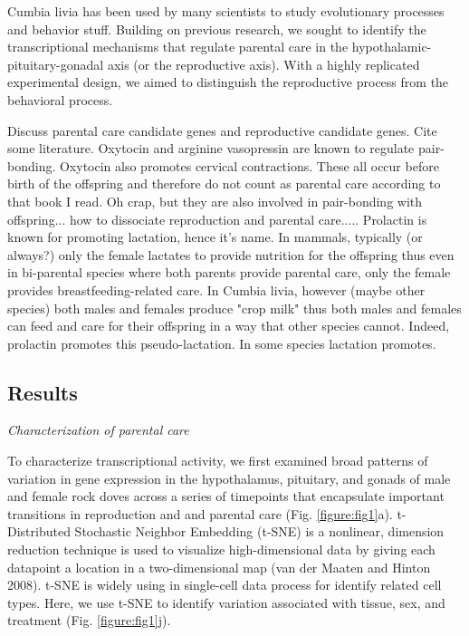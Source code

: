 Cumbia livia has been used by many scientists to study evolutionary processes and behavior stuff. Building on previous research, we sought to identify the transcriptional mechanisms that regulate parental care in the hypothalamic-pituitary-gonadal axis (or the reproductive axis). With a highly replicated experimental design, we aimed to distinguish the reproductive process from the behavioral process. 

Discuss parental care candidate genes and reproductive candidate genes. Cite some literature.  Oxytocin and arginine vasopressin are known to regulate pair-bonding.  Oxytocin also promotes cervical contractions. These all occur before birth of the offspring and therefore do not count as parental care according to that book I read. Oh crap, but they are also involved in pair-bonding with offspring... how to dissociate reproduction and parental care..... Prolactin is known for promoting lactation, hence it's name. In mammals, typically (or always?) only the female lactates to provide nutrition for the offspring thus even in bi-parental species where both parents provide parental care, only the female provides breastfeeding-related care. In Cumbia livia, however (maybe other species) both males and females produce "crop milk" thus both males and females can feed and care for their offspring in a way that other species cannot. Indeed, prolactin promotes this pseudo-lactation.  In some species lactation promotes.


\hypertarget{results}{%
\subsection{Results}\label{results}}

\emph{Characterization of parental care}

To characterize transcriptional activity, we first examined broad
patterns of variation in gene expression in the hypothalamus, pituitary,
and gonads of male and female rock doves across a series of timepoints
that encapsulate important transitions in reproduction and and parental
care (Fig. \ref{figure:fig1}a). t-Distributed Stochastic Neighbor
Embedding (t-SNE) is a nonlinear, dimension reduction technique is used
to visualize high-dimensional data by giving each datapoint a location
in a two-dimensional map (van der Maaten and Hinton 2008). t-SNE is
widely using in single-cell data process for identify related cell
types. Here, we use t-SNE to identify variation associated with tissue,
sex, and treatment (Fig. \ref{figure:fig1}j).

